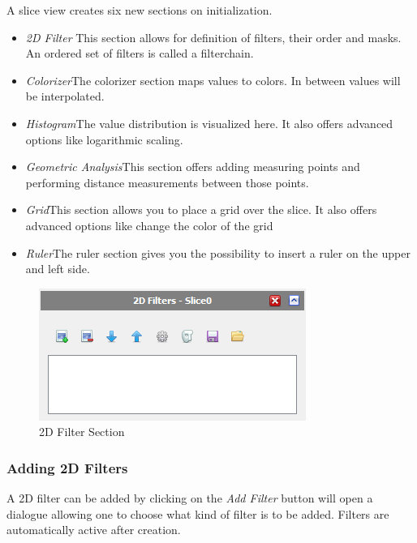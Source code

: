 A slice view creates six new sections on initialization.

\begin{itemize}
  \item{\emph{2D Filter }\newline This section allows for definition of filters, their order and masks. An ordered set of filters is called a filterchain.}
  \item{\emph{Colorizer}\newline The colorizer section maps values to colors. In between values will be interpolated.}
  \item{\emph{Histogram}\newline The value distribution is visualized here. It also offers advanced options like logarithmic scaling.}
  \item{\emph{Geometric Analysis}\newline This section offers adding measuring points and performing distance measurements between those points.}
  \item{\emph{Grid}\newline This section allows you to place a grid over the slice. It also offers advanced options like change the color of the grid}
  \item{\emph{Ruler}\newline The ruler section gives you the possibility to insert a ruler on the upper and left side. }

\end{itemize}

\begin{figure}[h]
  \centering
  \includegraphics[scale=1.0]{img/2d/2dfilter.png}
  \caption{2D Filter Section}
\end{figure}

\subsubsection{Adding 2D Filters}

A 2D filter can be added by clicking on the \emph{Add Filter} button will open a dialogue allowing one to choose what kind of filter is to be added. Filters are automatically active after creation.

